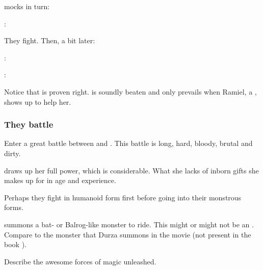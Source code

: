 \begin{garbage}
\Nzessuacrith{} mocks \Achsah{} in turn: 

\Achsah: 

They fight. 
Then, a bit later: 

\Achsah: 

\Nzessuacrith: 

Notice that \Nzessuacrith{} is proven right. 
\Achsah{} is soundly beaten and only prevails when Ramiel, a \sathariah, shows up to help her. 





\subsubsection{They battle}
Enter a great battle between \Nzessuacrith{} and \Achsah. 
This battle is long, hard, bloody, brutal and dirty. 

\Achsah{} draws up her full power, which is considerable. 
What she lacks of inborn gifts she makes up for in age and experience. 


Perhaps they fight in humanoid form first before going into their monstrous forms. 

\Achsah{} summons a bat- or Balrog-like monster to ride. 
This might or might not be an \hs{\umbra}. 
Compare to the monster that Durza summons in the movie \cite{Movie:Eragon} (not present in the book \cite{ChristopherPaolini:Eragon}). 

Describe the awesome forces of magic unleashed.


\end{garbage}
